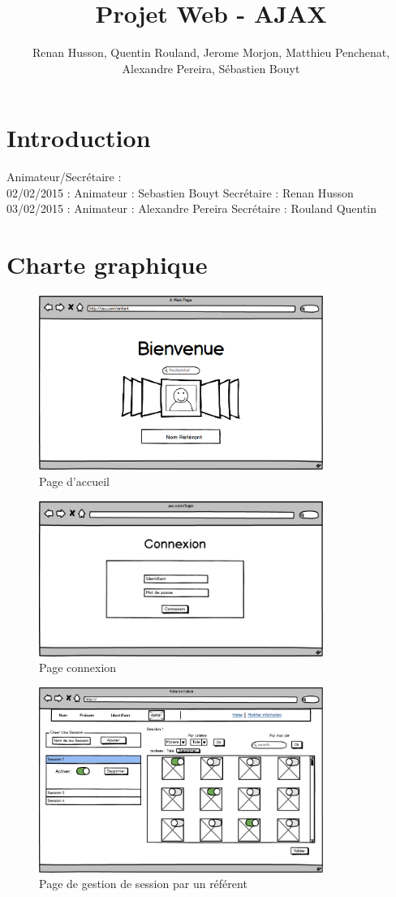 \documentclass[12pt,a4paper]{report}
\author{Renan Husson, Quentin Rouland, Jerome Morjon, Matthieu Penchenat, Alexandre Pereira, Sébastien Bouyt}
\affil{Université Toulouse, Jean Jaurès - L3 MIASHS \\ Document D2 : Conceptio}
\begin{document}
\title{Projet Web - AJAX}
\maketitle
\renewcommand{\contentsname}{Sommaire}
\tableofcontents
\chapter*{Introduction}
Animateur/Secrétaire : \\
02/02/2015 : Animateur : Sebastien Bouyt Secrétaire : Renan Husson \\
03/02/2015 : Animateur : Alexandre Pereira Secrétaire : Rouland Quentin


\chapter{Charte graphique}
\begin{figure}
	\includegraphics[width=350px]{../Maquette/Acceuil.png}
	\caption{Page d’accueil}
\end{figure}
\begin{figure}
	\includegraphics[width=350px]{../Maquette/Connexion.png}
	\caption{Page connexion}
\end{figure}
\begin{figure}
	\includegraphics[width=350px]{../Maquette/adherent.png}
	\caption{Page de gestion de session par un référent}
\end{figure}
\end{document}
